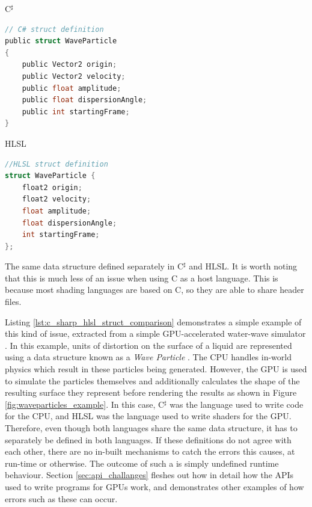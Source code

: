 \documentclass[a4paper,12pt,twoside,openright]{report}
\begin{document}
\begin{lstfloat}
\begin{center} C$^\sharp$ \end{center}
\begin{lstlisting}[language=C]
// C# struct definition
public struct WaveParticle
{
    public Vector2 origin;
    public Vector2 velocity;
    public float amplitude;
    public float dispersionAngle;
    public int startingFrame;
}
\end{lstlisting}
\begin{center} HLSL \end{center}
\begin{lstlisting}[language=C]
//HLSL struct definition
struct WaveParticle {
    float2 origin;
    float2 velocity;
    float amplitude;
    float dispersionAngle;
    int startingFrame;
};
\end{lstlisting}
\caption{The same data structure defined separately in C$^\sharp$ and HLSL. It
is worth noting that this is much less of an issue when using C as a host
language. This is because most shading languages are based on C, so they are
able to share header files.}
\label{lst:c_sharp_hlsl_struct_comparison}
\end{lstfloat}

Listing \ref{lst:c_sharp_hlsl_struct_comparison} demonstrates a simple example
of this kind of issue, extracted from a simple GPU-accelerated water-wave
simulator \cite{WaveParticlesGPU}. In this example, units of distortion on the
surface of a liquid are represented using a data structure known as a
\textit{Wave Particle} \cite{WaveParticlesOriginalPaper}. The CPU handles
in-world physics which result in these particles being generated. However, the
GPU is used to simulate the particles themselves and additionally calculates
the shape of the resulting surface they represent before rendering the results
as shown in Figure \ref{fig:waveparticles_example}. In this case, C$^\sharp$
was the language used to write code for the CPU, and HLSL was the language used
to write shaders for the GPU. Therefore, even though both languages share the
same data structure, it has to separately be defined in both languages. If
these definitions do not agree with each other, there are no in-built
mechanisms to catch the errors this causes, at run-time or otherwise. The
outcome of such a is simply undefined runtime behaviour. Section
\ref{sec:api_challanges} fleshes out how in detail how the APIs used to write
programs for GPUs work, and demonstrates other examples of how errors such as
these can occur.
\end{document}
